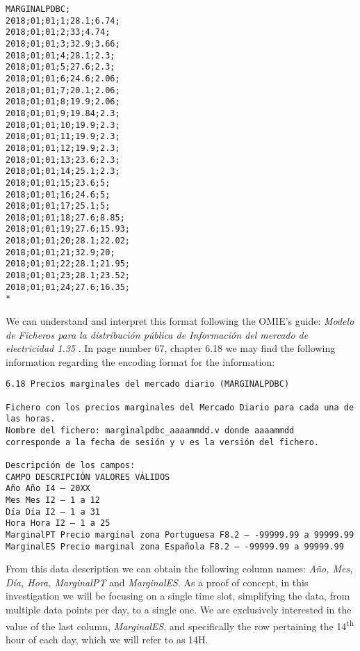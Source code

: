 \documentclass[12pt]{report} %
\begin{document}
\begin{small}
\begin{verbatim}
MARGINALPDBC;
2018;01;01;1;28.1;6.74;
2018;01;01;2;33;4.74;
2018;01;01;3;32.9;3.66;
2018;01;01;4;28.1;2.3;
2018;01;01;5;27.6;2.3;
2018;01;01;6;24.6;2.06;
2018;01;01;7;20.1;2.06;
2018;01;01;8;19.9;2.06;
2018;01;01;9;19.84;2.3;
2018;01;01;10;19.9;2.3;
2018;01;01;11;19.9;2.3;
2018;01;01;12;19.9;2.3;
2018;01;01;13;23.6;2.3;
2018;01;01;14;25.1;2.3;
2018;01;01;15;23.6;5;
2018;01;01;16;24.6;5;
2018;01;01;17;25.1;5;
2018;01;01;18;27.6;8.85;
2018;01;01;19;27.6;15.93;
2018;01;01;20;28.1;22.02;
2018;01;01;21;32.9;20;
2018;01;01;22;28.1;21.95;
2018;01;01;23;28.1;23.52;
2018;01;01;24;27.6;16.35;
*
\end{verbatim}
\end{small}

We can understand and interpret this format following the OMIE's guide: \textit{Modelo de Ficheros para la distribución pública de Información del mercado de electricidad 1.35} \cite{omie_formatos_2024}. In page number 67, chapter 6.18 we may find the following information regarding the encoding format for the information:

\begin{small} %
\begin{verbatim}
6.18 Precios marginales del mercado diario (MARGINALPDBC)

Fichero con los precios marginales del Mercado Diario para cada una de
las horas.
Nombre del fichero: marginalpdbc_aaaammdd.v donde aaaammdd
corresponde a la fecha de sesión y v es la versión del fichero.

Descripción de los campos:
CAMPO DESCRIPCIÓN VALORES VÁLIDOS
Año Año I4 – 20XX
Mes Mes I2 – 1 a 12
Día Día I2 – 1 a 31
Hora Hora I2 – 1 a 25
MarginalPT Precio marginal zona Portuguesa F8.2 – -99999.99 a 99999.99
MarginalES Precio marginal zona Española F8.2 – -99999.99 a 99999.99
\end{verbatim}
\end{small}

From this data description we can obtain the following column names: \textit{Año, Mes, Día, Hora, MarginalPT} and \textit{MarginalES}. As a proof of concept, in this investigation we will be focusing on a single time slot, simplifying the data, from multiple data points per day, to a single one. We are exclusively interested in the value of the last column, \textit{MarginalES}, and specifically the row pertaining the 14\textsuperscript{th} hour of each day, which we will refer to as 14H.
\end{document}
